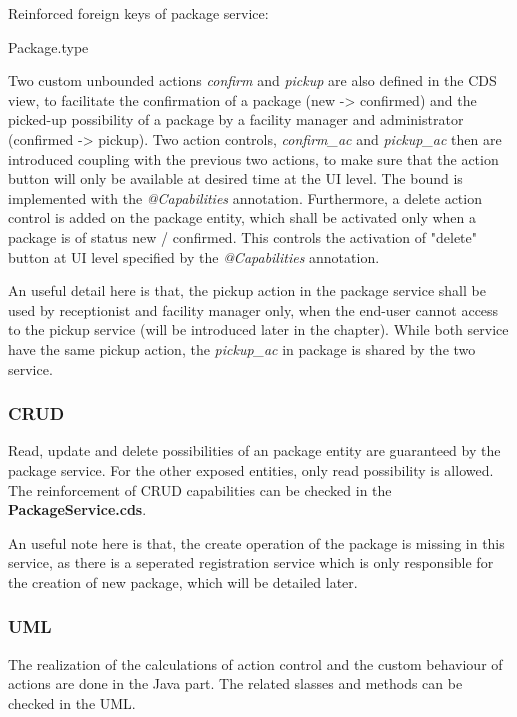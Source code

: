 \bigskip
Reinforced foreign keys of package service:
\begin{compactenum}
	\item Package.type
\end{compactenum}

\bigskip
Two custom unbounded actions \textit{confirm} and \textit{pickup} are also defined in the CDS view, to facilitate the confirmation of a package (new -> confirmed) and the picked-up possibility of a package by a facility manager and administrator (confirmed -> pickup). Two action controls, \textit{confirm\_ac} and \textit{pickup\_ac} then are introduced coupling with the previous two actions, to make sure that the action button will only be available at desired time at the UI level. The bound is implemented with the \textit{@Capabilities} annotation. Furthermore, a delete action control is added on the package entity, which shall be activated only when a package is of status new / confirmed. This controls the activation of "delete" button at UI level specified by the \textit{@Capabilities} annotation. 

\bigskip
An useful detail here is that, the pickup action in the package service shall be used by receptionist and facility manager only, when the end-user cannot access to the pickup service (will be introduced later in the chapter). While both service have the same pickup action, the \textit{pickup\_ac} in package is shared by the two service.

\subsubsection{CRUD}
Read, update and delete possibilities of an package entity are guaranteed by the package service. For the other exposed entities, only read possibility is allowed. The reinforcement of CRUD capabilities can be checked in the \textbf{PackageService.cds}. 

\bigskip
An useful note here is that, the create operation of the package is missing in this service, as there is a seperated registration service which is only responsible for the creation of new package, which will be detailed later.

\subsubsection{UML}

The realization of the calculations of action control and the custom behaviour of actions are done in the Java part. The related slasses and methods can be checked in the UML. 

